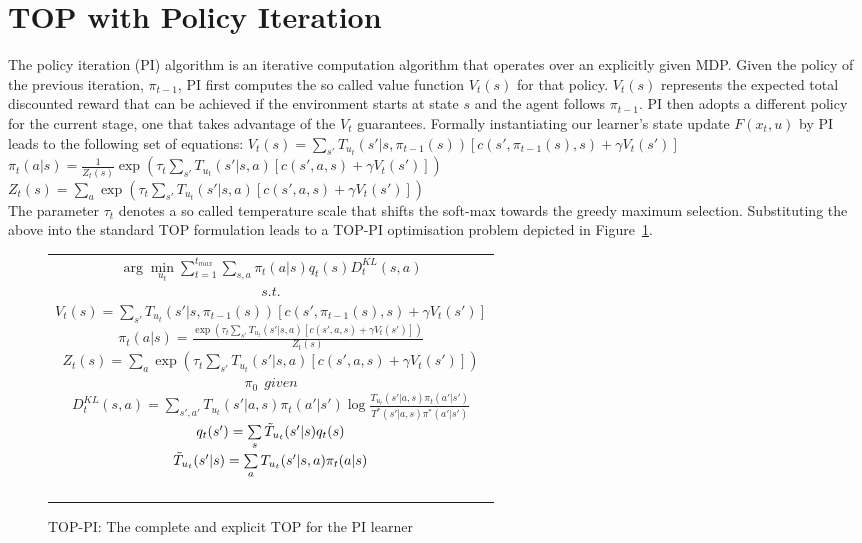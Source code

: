 \documentclass[letterpaper]{aamas2010}
\begin{document}
\section{TOP with Policy Iteration}\label{sec: TOP-PI}
The policy iteration (PI) algorithm is an iterative computation
algorithm that operates over an explicitly given MDP. Given the policy
of the previous iteration, $\pi_{t-1}$, PI first computes the so
called value function $V_t(s)$ for that policy. $V_t(s)$ represents
the expected total discounted reward that can be achieved if the
environment starts at state $s$ and the agent follows $\pi_{t-1}$. PI
then adopts a different policy for the current stage, one that takes
advantage of the $V_t$ guarantees. Formally instantiating our
learner's state update $F(x_t,u)$ by PI leads to the following set of
equations:
{\center 
$V_t(s)=\sum\limits_{s'}T_{u_t}(s'|s,\pi_{t-1}(s))\left[
c(s',\pi_{t-1}(s),s)+\gamma V_t(s')
\right]$\\
$\pi_t(a|s)=\frac{1}{Z_t(s)}\exp\left(\tau_t\sum\limits_{s'}T_{u_t}(s'|s,a)\left[
c(s',a,s)+\gamma V_t(s')
\right]\right)$\\
$Z_t(s)=\sum\limits_a\exp\left(\tau_t\sum\limits_{s'}T_{u_t}(s'|s,a)\left[
c(s',a,s)+\gamma V_t(s')
\right]\right)$\\
}
The parameter $\tau_t$ denotes a so called temperature scale that
shifts the soft-max towards the greedy maximum selection. Substituting
the above into the standard TOP formulation leads to a TOP-PI
optimisation problem depicted in Figure~\ref{t_opt_PI}.
\begin{figure}[th]
\begin{tabular}{|c|} \hline \parbox{3.2 in} {\center 
$\arg\min\limits_{u_t}\sum\limits_{t=1}^{t_{max}}\sum\limits_{s,a}\pi_t(a|s)q_t(s)D^{KL}_t(s,a)$\\
$s.t.$\\
$V_t(s)=\sum\limits_{s'}T_{u_t}(s'|s,\pi_{t-1}(s))\left[
c(s',\pi_{t-1}(s),s)+\gamma V_t(s')
\right]$\\
$\pi_t(a|s)=\frac{\exp\left(\tau_t\sum\limits_{s'}T_{u_t}(s'|s,a)\left[
c(s',a,s)+\gamma V_t(s')
\right]\right)}{Z_t(s)}$\\
$Z_t(s)=\sum\limits_a\exp\left(\tau_t\sum\limits_{s'}T_{u_t}(s'|s,a)\left[
c(s',a,s)+\gamma V_t(s')
\right]\right)$\\
$\pi_0\ \ \displaystyle{given}$\\
$D^{KL}_t(s,a)=\sum\limits_{s',a'}T_{u_t}(s'|a,s)\pi_t(a'|s')\log\frac{T_{u_t}(s'|a,s)\pi_t(a'|s')}{T^*(s'|a,s)\pi^*(a'|s')}$\\
$q_t(s')=\sum\limits_s\Tilde{T}_{u_t}(s'|s)q_t(s)$\\
$\Tilde{T}_{u_t}(s'|s)=\sum\limits_aT_{u_t}(s'|s,a)\pi_t(a|s)$\\\ \\
}\\ \hline \end{tabular}
\caption{\label{t_opt_PI}TOP-PI: The complete and explicit TOP for the
  PI learner}
\end{figure}
\end{document}
